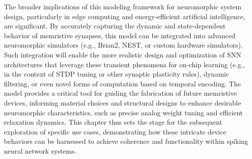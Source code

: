 \noindent The broader implications of this modeling framework for neuromorphic system design, particularly in edge computing and energy-efficient artificial intelligence, are significant. By accurately capturing the dynamic and state-dependent behavior of memristive synapses, this model can be integrated into advanced neuromorphic simulators (e.g., Brian2, NEST, or custom hardware simulators). Such integration will enable the more realistic design and optimization of SNN architectures that leverage these transient phenomena for on-chip learning (e.g., in the context of STDP tuning or other synaptic plasticity rules), dynamic filtering, or even novel forms of computation based on temporal encoding. The model provides a critical tool for guiding the fabrication of future memristive devices, informing material choices and structural designs to enhance desirable neuromorphic characteristics, such as precise analog weight tuning and efficient relaxation dynamics. This chapter thus sets the stage for the subsequent exploration of specific use cases, demonstrating how these intricate device behaviors can be harnessed to achieve coherence and functionality within spiking neural network systems.